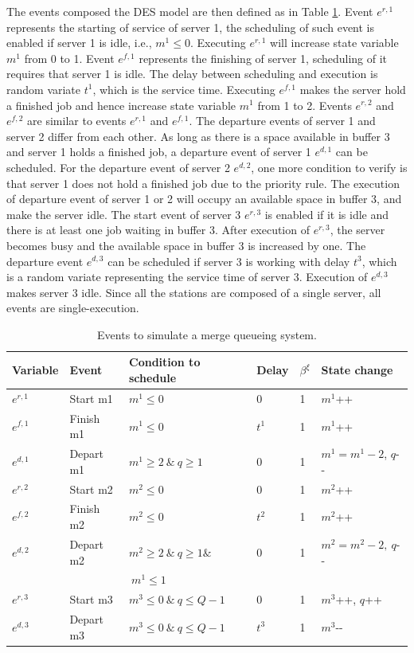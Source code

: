 \documentclass[]{interact}
\theoremstyle{plain}%
\theoremstyle{definition}
\theoremstyle{remark}
\begin{document}
The events composed the DES model are then defined as in Table \ref{tab:merge}. Event $e^{r,1}$ represents the starting of service of server 1, the scheduling of such event is enabled if server 1 is idle, i.e., $m^1\le 0$. Executing $e^{r,1}$ will increase state variable $m^1$ from 0 to 1. Event $e^{f,1}$ represents the finishing of server 1, scheduling of it requires that server 1 is idle. The delay between scheduling and execution is random variate $t^1$, which is the service time. Executing $e^{f,1}$ makes the server hold a finished job and hence increase state variable $m^1$ from 1 to 2. Events $e^{r,2}$ and $e^{f,2}$ are similar to events $e^{r,1}$ and $e^{f,1}$. The departure events of server 1 and server 2 differ from each other. As long as there is a space available in buffer 3 and server 1 holds a finished job, a departure event of server 1 $e^{d,1}$ can be scheduled. For the departure event of server 2 $e^{d,2}$, one more condition to verify is that server 1 does not hold a finished job due to the priority rule. The execution of departure event of server 1 or 2 will occupy an available space in buffer 3, and make the server idle. The start event of server 3 $e^{r,3}$ is enabled if it is idle and there is at least one job waiting in buffer 3. After execution of $e^{r,3}$, the server becomes busy and the available space in buffer 3 is increased by one. The departure event $e^{d,3}$ can be scheduled if server 3 is working with delay $t^3$, which is a random variate representing the service time of server 3. Execution of  $e^{d,3}$ makes server 3 idle. Since all the stations are composed of a single server, all events are single-execution. 

\begin{table}[h]
	\begin{tabular}{|llllll|}\hline
		Variable&Event & Condition to schedule & Delay&$\beta^{\xi}$& State change\\\hline
		$e^{r,1}$&Start m1 	& $m^1\le 0$ & $0$&1& $m^1${\footnotesize++} \\\hline
		$e^{f,1}$&Finish m1 & $m^1\le 0$ 	& $t^1$ &1& $m^1${\footnotesize++}\\\hline
		$e^{d,1}$&Depart m1& $m^1\ge2\ \&\  q\ge 1$&$0$ &1 & $m^1 = m^1-2$, $q${\small-}{\small-} \\\hline
		$e^{r,2}$&Start m2 	& $m^2\le 0$ & $0$ &1& $m^2${\footnotesize++} \\	\hline
		$e^{f,2}$&Finish m2 & $m^2\le 0$ 	& $t^2$ &1 & $m^2${\footnotesize++}\\\hline
		$e^{d,2}$&Depart m2& $m^2\ge2\ \&\ q\ge 1\&$&$0$  &1& $m^2=m^2-2,\ q${\small-}{\small-} \\
		&&$\ m^1\le 1 $ & &&\\\hline
		$e^{r,3}$& Start m3 & $m^3 \le 0\ \&\ q\le Q-1$&$0$  &1& $m^3${\footnotesize++}, $q${\footnotesize++}\\\hline
		$e^{d,3}$& Depart m3 & $m^3 \le 0\ \&\ q\le Q-1$ & $t^3$  &1& $m^3${\small-}{\small-} \\\hline
	\end{tabular}
	\caption{Events to simulate a merge queueing system.}
	\label{tab:merge}
\end{table}
\end{document}
